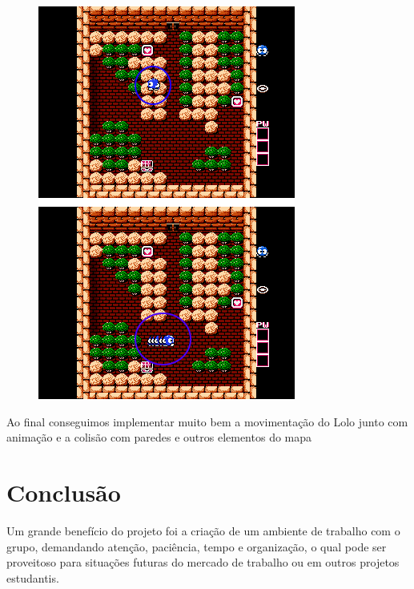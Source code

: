 \documentclass[10pt, conference, compsocconf]{IEEEtran}
\begin{document}
\begin{figure}[htb]
  \begin{center}
   \includegraphics[width=0.9\linewidth]{./Figures/image_newest.png}
  \end{center}
  \caption{}
  \label{fig:01}
\end{figure}


Ao final conseguimos implementar muito bem a movimentação do Lolo junto com
animação e a colisão com paredes e outros elementos do mapa

\section{Conclusão}
Um grande benefício do projeto foi a criação de um ambiente de trabalho com o
grupo, demandando atenção, paciência, tempo e organização, o qual pode ser
proveitoso para situações futuras do mercado de trabalho ou em outros projetos
estudantis.
\end{document}

